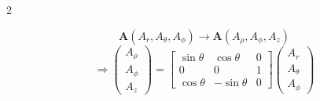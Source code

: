 \begin{multicols}{2}
\begin{itemform}
                              $$\mathbf{A}(A_r, A_\theta, A_\phi) \to \mathbf{A}(A_\rho, A_\phi, A_z)$$
                              $$\Rightarrow
                              \begin{pmatrix}
                                A_\rho \\
                                A_\phi \\
                                A_z
                              \end{pmatrix}
                              =
                              \begin{bmatrix}
                                \sin\theta & \cos\theta & 0 \\
                                0 & 0 & 1 \\
                                \cos\theta & -\sin\theta & 0
                              \end{bmatrix}
                              \begin{pmatrix}
                                A_r \\
                                A_\theta \\
                                A_\phi
                              \end{pmatrix}
                              $$
                            \end{itemform}
                          \end{multicols}


